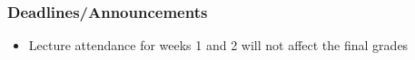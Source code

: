 
\begin{frame}
    \frametitle{Deadlines/Announcements}
\begin{itemize}
            \item Lecture attendance for weeks 1 and 2 will not affect the final grades
        \end{itemize}
\end{frame}
